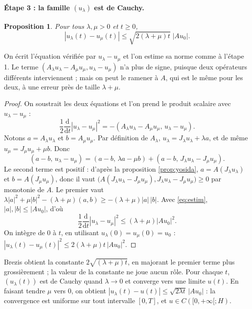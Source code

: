 \documentclass[11pt,a4paper]{article}
\theoremstyle{plain}
\newtheorem{proposition}[theoreme]{Proposition}
\theoremstyle{definition}
\theoremstyle{remark}
\newcommand{\dt}{\frac{\mathrm{d}}{\mathrm{d}t}}
\begin{document}
\paragraph{Étape 3 : la famille $(u_\lambda)$ est de Cauchy.}

\begin{proposition}\label{prop:cauchy}
Pour tous $\lambda,\mu>0$ et $t\geq0$,
\[
  |u_\lambda(t)-u_\mu(t)|\leq\sqrt{2(\lambda+\mu)t}\;|Au_0| .
\]
\end{proposition}

On écrit l'équation vérifiée par $u_\lambda-u_\mu$ et l'on estime sa norme comme à l'étape 1. Le terme $(A_\lambda u_\lambda-A_\mu u_\mu,u_\lambda-u_\mu)$ n'a plus de signe, puisque deux opérateurs différents interviennent ; mais on peut le ramener à $A$, qui est le même pour les deux, à une erreur près de taille $\lambda+\mu$.

\begin{proof}
On soustrait les deux équations et l'on prend le produit scalaire avec $u_\lambda-u_\mu$ :
\[
  \frac12\dt|u_\lambda-u_\mu|^2=-(A_\lambda u_\lambda-A_\mu u_\mu,\,u_\lambda-u_\mu) .
\]
Notons $a=A_\lambda u_\lambda$ et $b=A_\mu u_\mu$. Par définition de $A_\lambda$, $u_\lambda=J_\lambda u_\lambda+\lambda a$, et de même $u_\mu=J_\mu u_\mu+\mu b$. Donc
\[
  (a-b,\,u_\lambda-u_\mu)=(a-b,\,\lambda a-\mu b)+(a-b,\,J_\lambda u_\lambda-J_\mu u_\mu) .
\]
Le second terme est positif : d'après la proposition \ref{prop:yosida}, $a=A(J_\lambda u_\lambda)$ et $b=A(J_\mu u_\mu)$, donc il vaut $\big(A(J_\lambda u_\lambda-J_\mu u_\mu),J_\lambda u_\lambda-J_\mu u_\mu\big)\geq0$ par monotonie de $A$. Le premier vaut $\lambda|a|^2+\mu|b|^2-(\lambda+\mu)(a,b)\geq-(\lambda+\mu)|a|\,|b|$. Avec \eqref{eq:estim}, $|a|,|b|\leq|Au_0|$, d'où
\[
  \frac12\dt|u_\lambda-u_\mu|^2\leq(\lambda+\mu)|Au_0|^2 .
\]
On intègre de $0$ à $t$, en utilisant $u_\lambda(0)=u_\mu(0)=u_0$ : $|u_\lambda(t)-u_\mu(t)|^2\leq2(\lambda+\mu)t\,|Au_0|^2$.
\end{proof}

Brezis obtient la constante $2\sqrt{(\lambda+\mu)t}$, en majorant le premier terme plus grossièrement ; la valeur de la constante ne joue aucun rôle. Pour chaque $t$, $(u_\lambda(t))$ est de Cauchy quand $\lambda\to0$ et converge vers une limite $u(t)$. En faisant tendre $\mu$ vers $0$, on obtient $|u_\lambda(t)-u(t)|\leq\sqrt{2\lambda t}\,|Au_0|$ : la convergence est uniforme sur tout intervalle $[0,T]$, et $u\in C([0,+\infty[;H)$.
\end{document}
